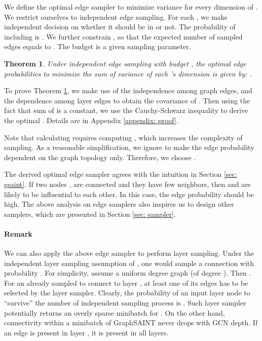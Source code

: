\documentclass{article} \usepackage{iclr2020_conference,times}
\newtheorem{theorem}{Theorem}[section]
\newcommand{\graphsaint}{{\fontfamily{lmtt}\selectfont GraphSAINT}}
\begin{document}
We define the optimal edge sampler to minimize variance for every dimension of . We restrict ourselves to independent edge sampling. For each , we make independent decision on whether it should be in  or not. The probability of including  is . We further constrain , so that the expected number of sampled edges equals to . The budget  is a given sampling parameter. 



\begin{theorem}
\label{thm: var}
Under independent edge sampling with budget , the optimal edge probabilities to minimize the sum of variance of each 's dimension  is given by: .
\end{theorem}

To prove Theorem \ref{thm: var}, we make use of the independence among graph edges, and the dependence among layer edges to obtain the covariance of . Then using the fact that sum of  is a constant, we use the Cauchy-Schwarz inequality to derive the optimal . Details are in Appendix \ref{appendix: proof}. 



Note that calculating  requires computing , which increases the complexity of sampling. As a reasonable simplification, we ignore  to make the edge probability dependent on the graph topology only. Therefore, we choose .

The derived optimal edge sampler agrees with the intuition in Section \ref{sec: gsaint}. If two nodes ,  are connected and they have few neighbors, then  and  are likely to be influential to each other. In this case, the edge probability  should be high. The above analysis on edge samplers also inspires us to design other samplers, which are presented in Section \ref{sec: sampler}.


\paragraph{Remark} We can also apply the above edge sampler to perform layer sampling. Under the independent layer sampling assumption of \cite{fastgcn}, one would sample a connection  with probability . 
For simplicity, assume a uniform degree graph (of degree ). Then . For an already sampled  to connect to layer , at least one of its edges has to be selected by the layer  sampler. 
Clearly, the probability of an input layer node to ``survive'' the  number of independent sampling process is . 
Such layer sampler potentially returns an overly sparse minibatch for . On the other hand, connectivity within a minibatch of {\graphsaint} never drops with GCN depth. If an edge is present in layer , it is present in all layers. 
\end{document}

